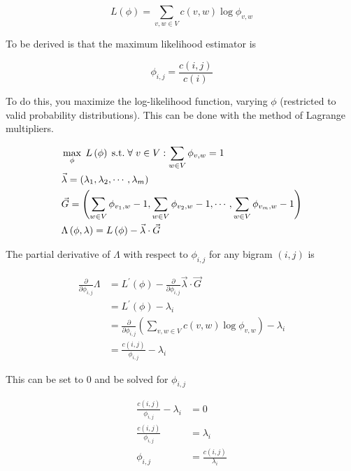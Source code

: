 \documentclass[11pt]{article}
\begin{document}
$$ L \left( \phi \right) = \sum \limits_{v, w \in V} c \left( v, w \right) \log{\phi_{v, w}} $$

To be derived is that the maximum likelihood estimator is

$$\phi_{i, j} = \frac{c \left( i, j \right)}{ c \left( i \right)}$$

To do this, you maximize the log-likelihood function, varying $\phi$ (restricted to valid probability distributions). This can be done with the method of Lagrange multipliers.

\begin{align*}
&\max \limits_{\phi} \; L\left( \phi \right) \; \text{s.t.} \; \forall \; v \in V : \sum \limits_{w \in V} \phi_{v, w} = 1 \\
%
&\vec{\lambda} = \left( \lambda_1, \lambda_2, \cdots , \lambda_m \right) \notag \\
%
&\vec{G} = \left( \sum \limits_{w \in V} \phi_{v_1, w} - 1, \sum \limits_{w \in V} \phi_{v_2, w} - 1, \cdots , \sum \limits_{w \in V} \phi_{v_m, w} - 1 \right) \\
%
&\Lambda \left( \phi, \lambda \right) = L\left( \phi \right) - \vec{\lambda} \cdot \vec{G}
\end{align*}

The partial derivative of $\Lambda$ with respect to $\phi_{i, j}$ for any bigram $\left( i, j \right)$ is

\begin{align*}
%
\frac{\partial}{\partial \phi_{i, j}} \Lambda &= L^\prime \left( \phi \right) - \frac{\partial}{\partial \phi_{i, j}} \vec{\lambda} \cdot \vec{G} \\
%
&= L^\prime \left( \phi \right) - \lambda_i \\
%
&= \frac{\partial}{\partial \phi_{i, j}} \left( \sum \limits_{v, w \in V} c \! \left( v, w \right) \log{\phi_{v, w}} \right) - \lambda_i \\
%
&= \frac{c \left( i, j \right)}{\phi_{i, j}} - \lambda_i
\end{align*}

This can be set to $0$ and be solved for $\phi_{i, j}$

\begin{align*}
\frac{c \left( i, j \right)}{\phi_{i, j}} - \lambda_i &= 0 \\
%
\frac{c \left( i, j \right)}{\phi_{i, j}} &= \lambda_i \\
%
\phi_{i, j} &= \frac{c \left( i, j \right)}{\lambda_i}
\end{align*}
\end{document}
